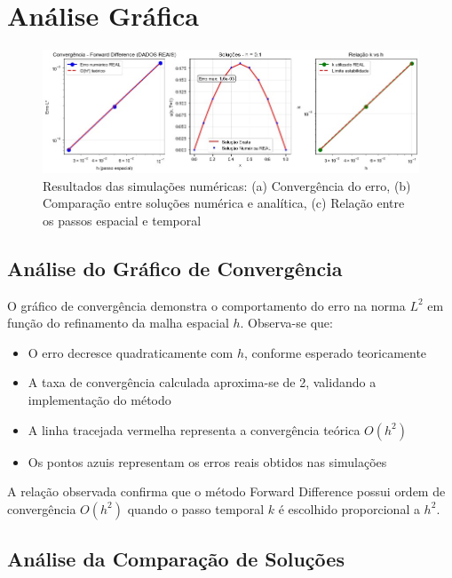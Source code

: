 \documentclass[10pt,twocolumn]{article}
\begin{document}
\section{Análise Gráfica}

\begin{figure}[H]
\centering
\includegraphics[width=1.0\linewidth]{imgs/graphs}
\caption{Resultados das simulações numéricas: (a) Convergência do erro, (b) Comparação entre soluções numérica e analítica, (c) Relação entre os passos espacial e temporal}
\label{fig:resultados}
\end{figure}

\subsection{Análise do Gráfico de Convergência}

O gráfico de convergência demonstra o comportamento do erro na norma $L^2$ em função do refinamento da malha espacial $h$. Observa-se que:

\begin{itemize}
    \item O erro decresce quadraticamente com $h$, conforme esperado teoricamente
    \item A taxa de convergência calculada aproxima-se de 2, validando a implementação do método
    \item A linha tracejada vermelha representa a convergência teórica $O(h^2)$
    \item Os pontos azuis representam os erros reais obtidos nas simulações
\end{itemize}

A relação observada confirma que o método Forward Difference possui ordem de convergência $O(h^2)$ quando o passo temporal $k$ é escolhido proporcional a $h^2$.

\subsection{Análise da Comparação de Soluções}
\end{document}
